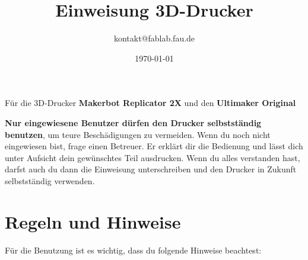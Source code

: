 \documentclass{\basedir/fablab-document}
\date{\today}
\author{kontakt@fablab.fau.de}
\title{Einweisung 3D-Drucker}
\begin{document}
\maketitle
\begin{center}
	Für die 3D-Drucker \textbf{Makerbot Replicator 2X} und den \textbf{Ultimaker Original}
\end{center}

\textbf{Nur eingewiesene Benutzer dürfen den Drucker selbstständig benutzen}, um teure Beschädigungen zu vermeiden. Wenn du noch nicht eingewiesen bist, frage einen Betreuer. Er erklärt dir die Bedienung und lässt dich unter Aufsicht dein gewünschtes Teil ausdrucken. Wenn du alles verstanden hast, darfst auch du dann die Einweisung unterschreiben und den Drucker in Zukunft selbstständig verwenden.

\section{Regeln und Hinweise}
Für die Benutzung ist es wichtig, dass du folgende Hinweise beachtest:
\end{document}
